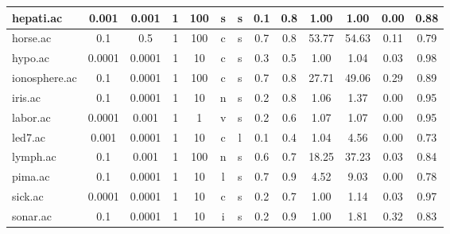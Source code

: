 \begin{table}[htbp]
\begin{tabular}{|l|c|c|c|c|c|c|c|c||c|c|c|c|}
		\hline
		hepati.ac      & 0.001    & 0.001       & 1              & 100      & s                   & s        & 0.1    & 0.8   & 1.00           & 1.00           & 0.00           & 0.88           \\
		\hline
		horse.ac       & 0.1      & 0.5         & 1              & 100      & c                   & s        & 0.7    & 0.8   & 53.77          & 54.63          & 0.11           & 0.79           \\
		\hline
		hypo.ac        & 0.0001   & 0.0001      & 1              & 10       & c                   & s        & 0.3    & 0.5   & 1.00           & 1.04           & 0.03           & 0.98           \\
		\hline
		ionosphere.ac  & 0.1      & 0.0001      & 1              & 100      & c                   & s        & 0.7    & 0.8   & 27.71          & 49.06          & 0.29           & 0.89           \\
		\hline
		iris.ac        & 0.1      & 0.0001      & 1              & 10       & n                   & s        & 0.2    & 0.8   & 1.06           & 1.37           & 0.00           & 0.95           \\
		\hline
		labor.ac       & 0.0001   & 0.001       & 1              & 1        & v                   & s        & 0.2    & 0.6   & 1.07           & 1.07           & 0.00           & 0.95           \\
		\hline
		led7.ac        & 0.001    & 0.0001      & 1              & 10       & c                   & l        & 0.1    & 0.4   & 1.04           & 4.56           & 0.00           & 0.73           \\
		\hline
		lymph.ac       & 0.1      & 0.001       & 1              & 100      & n                   & s        & 0.6    & 0.7   & 18.25          & 37.23          & 0.03           & 0.84           \\
		\hline
		pima.ac        & 0.1      & 0.0001      & 1              & 10       & l                   & s        & 0.7    & 0.9   & 4.52           & 9.03           & 0.00           & 0.78           \\
		\hline
		sick.ac        & 0.0001   & 0.0001      & 1              & 10       & c                   & s        & 0.2    & 0.7   & 1.00           & 1.14           & 0.03           & 0.97           \\
		\hline
		sonar.ac       & 0.1      & 0.0001      & 1              & 10       & i                   & s        & 0.2    & 0.9   & 1.00           & 1.81           & 0.32           & 0.83           \\

\end{tabular}
\end{table}
